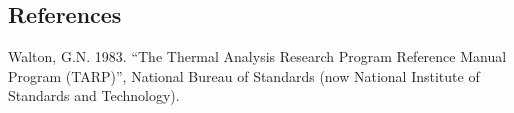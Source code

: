 \subsection{References}\label{references-044}

Walton, G.N. 1983. ``The Thermal Analysis Research Program Reference Manual Program (TARP)'', National Bureau of Standards (now National Institute of Standards and Technology).
